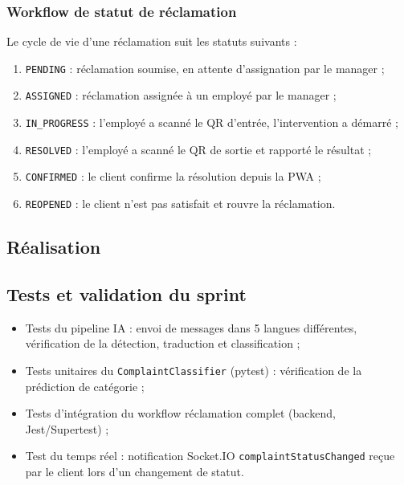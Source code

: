 \subsubsection{Workflow de statut de réclamation}

Le cycle de vie d'une réclamation suit les statuts suivants :
\begin{enumerate}
  \item \texttt{PENDING} : réclamation soumise, en attente d'assignation par le manager ;
  \item \texttt{ASSIGNED} : réclamation assignée à un employé par le manager ;
  \item \texttt{IN\_PROGRESS} : l'employé a scanné le QR d'entrée, l'intervention a démarré ;
  \item \texttt{RESOLVED} : l'employé a scanné le QR de sortie et rapporté le résultat ;
  \item \texttt{CONFIRMED} : le client confirme la résolution depuis la PWA ;
  \item \texttt{REOPENED} : le client n'est pas satisfait et rouvre la réclamation.
\end{enumerate}

\subsection{Réalisation}


\subsection{Tests et validation du sprint}

\begin{itemize}
  \item Tests du pipeline IA : envoi de messages dans 5 langues différentes, vérification de la détection, traduction et classification ;
  \item Tests unitaires du \texttt{ComplaintClassifier} (pytest) : vérification de la prédiction de catégorie ;
  \item Tests d'intégration du workflow réclamation complet (backend, Jest/Supertest) ;
  \item Test du temps réel : notification Socket.IO \texttt{complaintStatusChanged} reçue par le client lors d'un changement de statut.
\end{itemize}

